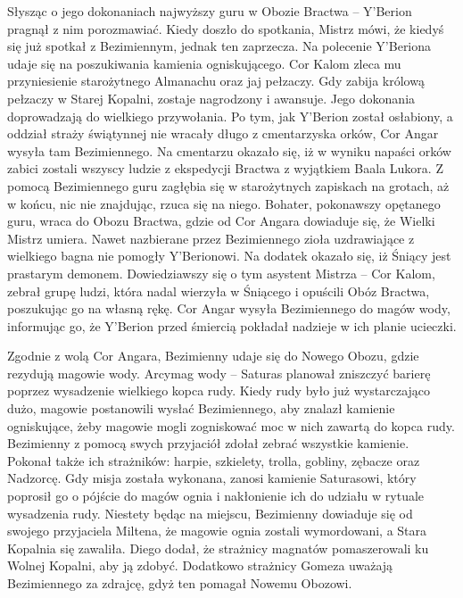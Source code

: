 \documentclass[11pt,polish, openany]{book}
\begin{document}
Słysząc o jego dokonaniach najwyższy guru w Obozie Bractwa – Y'Berion pragnął z nim porozmawiać. Kiedy doszło do spotkania, Mistrz mówi, że kiedyś się już spotkał z Bezimiennym, jednak ten zaprzecza. Na polecenie Y'Beriona udaje się na poszukiwania kamienia ogniskującego. Cor Kalom zleca mu przyniesienie starożytnego Almanachu oraz jaj pełzaczy. Gdy zabija królową pełzaczy w Starej Kopalni, zostaje nagrodzony i awansuje. Jego dokonania doprowadzają do wielkiego przywołania. Po tym, jak Y'Berion został osłabiony, a oddział straży świątynnej nie wracały długo z cmentarzyska orków, Cor Angar wysyła tam Bezimiennego. Na cmentarzu okazało się, iż w wyniku napaści orków zabici zostali wszyscy ludzie z ekspedycji Bractwa z wyjątkiem Baala Lukora. Z pomocą Bezimiennego guru zagłębia się w starożytnych zapiskach na grotach, aż w końcu, nic nie znajdując, rzuca się na niego. Bohater, pokonawszy opętanego guru, wraca do Obozu Bractwa, gdzie od Cor Angara dowiaduje się, że Wielki Mistrz umiera. Nawet nazbierane przez Bezimiennego zioła uzdrawiające z wielkiego bagna nie pomogły Y'Berionowi. Na dodatek okazało się, iż Śniący jest prastarym demonem. Dowiedziawszy się o tym asystent Mistrza – Cor Kalom, zebrał grupę ludzi, która nadal wierzyła w Śniącego i opuścili Obóz Bractwa, poszukując go na własną rękę. Cor Angar wysyła Bezimiennego do magów wody, informując go, że Y'Berion przed śmiercią pokładał nadzieje w ich planie ucieczki.

Zgodnie z wolą Cor Angara, Bezimienny udaje się do Nowego Obozu, gdzie rezydują magowie wody. Arcymag wody – Saturas planował zniszczyć barierę poprzez wysadzenie wielkiego kopca rudy. Kiedy rudy było już wystarczająco dużo, magowie postanowili wysłać Bezimiennego, aby znalazł kamienie ogniskujące, żeby magowie mogli zogniskować moc w nich zawartą do kopca rudy. Bezimienny z pomocą swych przyjaciół zdołał zebrać wszystkie kamienie. Pokonał także ich strażników: harpie, szkielety, trolla, gobliny, zębacze oraz Nadzorcę. Gdy misja została wykonana, zanosi kamienie Saturasowi, który poprosił go o pójście do magów ognia i nakłonienie ich do udziału w rytuale wysadzenia rudy. Niestety będąc na miejscu, Bezimienny dowiaduje się od swojego przyjaciela Miltena, że magowie ognia zostali wymordowani, a Stara Kopalnia się zawaliła. Diego dodał, że strażnicy magnatów pomaszerowali ku Wolnej Kopalni, aby ją zdobyć. Dodatkowo strażnicy Gomeza uważają Bezimiennego za zdrajcę, gdyż ten pomagał Nowemu Obozowi.
\end{document}
